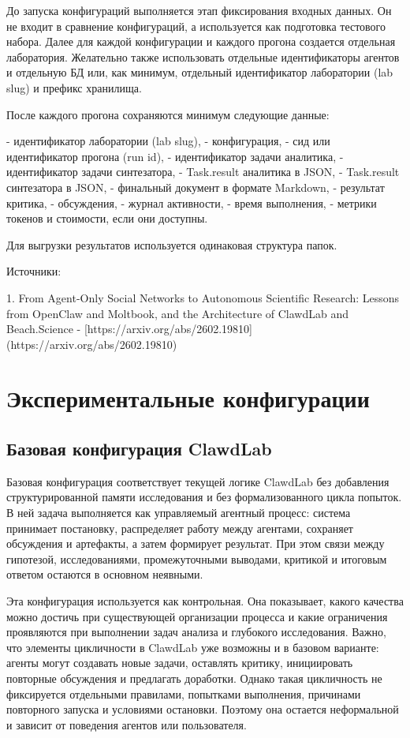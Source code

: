 До запуска конфигураций выполняется этап фиксирования входных данных. Он не входит в сравнение конфигураций, а используется как подготовка тестового набора. 
Далее для каждой конфигурации и каждого прогона создается отдельная лаборатория. Желательно также использовать отдельные идентификаторы агентов и отдельную БД или, как минимум, отдельный идентификатор лаборатории (lab slug) и префикс хранилища.

После каждого прогона сохраняются минимум следующие данные:

- идентификатор лаборатории (lab slug),
- конфигурация,
- сид или идентификатор прогона (run id),
- идентификатор задачи аналитика,
- идентификатор задачи синтезатора,
- Task.result аналитика в JSON,
- Task.result синтезатора в JSON,
- финальный документ в формате Markdown,
- результат критика,
- обсуждения,
- журнал активности,
- время выполнения,
- метрики токенов и стоимости, если они доступны.

Для выгрузки результатов используется одинаковая структура папок.

Источники:

1. From Agent-Only Social Networks to Autonomous Scientific Research: Lessons from OpenClaw and Moltbook, and the Architecture of ClawdLab and Beach.Science - [https://arxiv.org/abs/2602.19810](https://arxiv.org/abs/2602.19810)

\section{Экспериментальные конфигурации}

\subsection{Базовая конфигурация ClawdLab}

Базовая конфигурация соответствует текущей логике ClawdLab без добавления структурированной памяти исследования и без формализованного цикла попыток. В ней задача выполняется как управляемый агентный процесс: система принимает постановку, распределяет работу между агентами, сохраняет обсуждения и артефакты, а затем формирует результат. При этом связи между гипотезой, исследованиями, промежуточными выводами, критикой и итоговым ответом остаются в основном неявными.

Эта конфигурация используется как контрольная. Она показывает, какого качества можно достичь при существующей организации процесса и какие ограничения проявляются при выполнении задач анализа и глубокого исследования. Важно, что элементы цикличности в ClawdLab уже возможны и в базовом варианте: агенты могут создавать новые задачи, оставлять критику, инициировать повторные обсуждения и предлагать доработки. Однако такая цикличность не фиксируется отдельными правилами, попытками выполнения, причинами повторного запуска и условиями остановки. Поэтому она остается неформальной и зависит от поведения агентов или пользователя.

